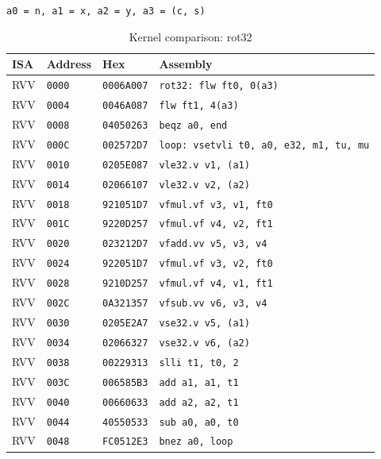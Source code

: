 \begin{table}[htbp]
\centering
\caption{Kernel comparison: rot32}
\begingroup
\scriptsize
\setlength{\tabcolsep}{4pt}
\noindent \texttt{a0 = n, a1 = x, a2 = y, a3 = (c, s)}\par
\vspace{0.6ex}
\begin{tabular}{@{}l|l|l|p{7.2cm}@{}}
\toprule
ISA & Address & Hex & Assembly \\
\midrule
RVV & \texttt{0000} & \texttt{0006A007} & \texttt{rot32: flw ft0, 0(a3)} \\
RVV & \texttt{0004} & \texttt{0046A087} & \texttt{flw ft1, 4(a3)} \\
RVV & \texttt{0008} & \texttt{04050263} & \texttt{beqz a0, end} \\
RVV & \texttt{000C} & \texttt{002572D7} & \texttt{loop: vsetvli t0, a0, e32, m1, tu, mu} \\
RVV & \texttt{0010} & \texttt{0205E087} & \texttt{vle32.v v1, (a1)} \\
RVV & \texttt{0014} & \texttt{02066107} & \texttt{vle32.v v2, (a2)} \\
RVV & \texttt{0018} & \texttt{921051D7} & \texttt{vfmul.vf v3, v1, ft0} \\
RVV & \texttt{001C} & \texttt{9220D257} & \texttt{vfmul.vf v4, v2, ft1} \\
RVV & \texttt{0020} & \texttt{023212D7} & \texttt{vfadd.vv v5, v3, v4} \\
RVV & \texttt{0024} & \texttt{922051D7} & \texttt{vfmul.vf v3, v2, ft0} \\
RVV & \texttt{0028} & \texttt{9210D257} & \texttt{vfmul.vf v4, v1, ft1} \\
RVV & \texttt{002C} & \texttt{0A321357} & \texttt{vfsub.vv v6, v3, v4} \\
RVV & \texttt{0030} & \texttt{0205E2A7} & \texttt{vse32.v v5, (a1)} \\
RVV & \texttt{0034} & \texttt{02066327} & \texttt{vse32.v v6, (a2)} \\
RVV & \texttt{0038} & \texttt{00229313} & \texttt{slli t1, t0, 2} \\
RVV & \texttt{003C} & \texttt{006585B3} & \texttt{add a1, a1, t1} \\
RVV & \texttt{0040} & \texttt{00660633} & \texttt{add a2, a2, t1} \\
RVV & \texttt{0044} & \texttt{40550533} & \texttt{sub a0, a0, t0} \\
RVV & \texttt{0048} & \texttt{FC0512E3} & \texttt{bnez a0, loop} \\

\end{tabular}
\end{table}
